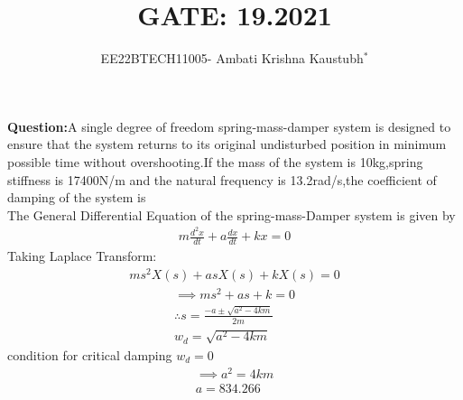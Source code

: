 \documentclass[journal,12pt,twocolumn]{IEEEtran}
\theoremstyle{remark}
\begin{document}

\vspace{3cm}


\title{GATE: 19.2021}
\author{EE22BTECH11005- Ambati Krishna Kaustubh$^{*}$%
}

\maketitle
\newpage
\bigskip

\textbf{Question:}A single degree of freedom spring-mass-damper system is designed to ensure that the system returns to its original undisturbed position in minimum possible time without overshooting.If the mass of the system is 10kg,spring stiffness is 17400N/m and the natural frequency is 13.2rad/s,the coefficient of damping of the system is\\[2pt]

\solution
\fi 
The General Differential Equation of the spring-mass-Damper system is given by
\begin{align}
    m\frac{d^2x}{dt}+a\frac{dx}{dt}+kx=0
\end{align}
Taking Laplace Transform:
\begin{align}
    ms^2X(s)+asX(s)+kX(s)=0
\end{align}
\begin{align}
    \implies ms^2+as+k=0\\
    \therefore s=\frac{-a\pm \sqrt{a^2-4km}}{2m}\\
    w_d=\sqrt{a^2-4km}
\end{align}
condition for critical damping $w_d=0$
\begin{align}
    \implies a^2=4km \\
    a=834.266
\end{align}


\end{document}
